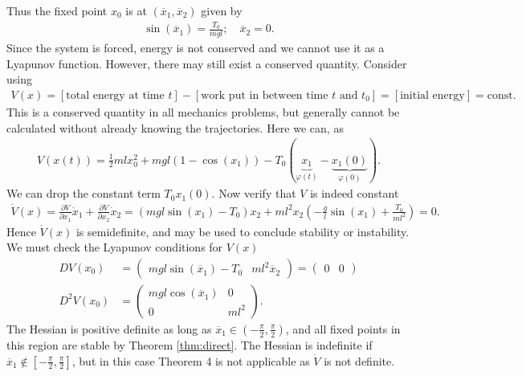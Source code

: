 \begin{ex}
Thus the fixed point $x_0$ is at $(\overline{x}_1, \overline{x}_2)$ given by 
\begin{align}
	\sin(\overline{x}_1) = \frac{T_0}{mgl};\quad \overline{x}_2=0.
\end{align}
Since the system is forced, energy is not conserved and we cannot use it as a Lyapunov function. However, there may still exist a conserved quantity. Consider using
\begin{align}
	V(x) = \left[  \textrm{total energy at time } t \right] - \left[  \textrm{work put in between time } t  \textrm{ and } t_0 \right] = \left[ \textrm{initial energy} \right] =  \textrm{const.}  
\end{align}
This is a conserved quantity in all mechanics problems, but generally cannot be calculated without already knowing the trajectories. Here we can, as
\begin{align}
	V(x(t)) = \frac{1}{2} ml x_0^2 + mgl(1- \cos(x_1)) - T_0(\underbrace{x_1}_{\varphi(t)} - \underbrace{x_1(0)}_{\varphi(0)}).
\end{align}
We can drop the constant term $T_0 x_1(0)$. Now verify that $V$ is indeed constant
\begin{align}
	\dot{V}(x) = \frac{\partial V}{\partial x_1} \dot{x}_1 + \frac{\partial V}{\partial x_2} \dot{x}_2 = \left( mgl \sin(x_1) - T_0\right) x_2 + ml^2x_2 \left( - \frac{g}{l}\sin(x_1) + \frac{T_0}{ml^2} \right) = 0.
\end{align}
Hence $\dot{V}(x)$ is semidefinite, and may be used to conclude stability or instability. We must check the Lyapunov conditions for $V(x)$ 
\begin{align}
	DV(x_0) &= 
\begin{pmatrix}
	mgl \sin(\overline{x}_1) - T_0 & ml^2 \overline{x}_2
\end{pmatrix}
=
\begin{pmatrix}
	0& 0
\end{pmatrix}
\\
D^2V(x_0) &= 
\begin{pmatrix}
	mgl \cos(\overline{x}_1) & 0 \\
	0 & ml^2
\end{pmatrix}.
\end{align}
The Hessian is positive definite as long as $\overline{x}_1 \in \left(-\frac{\pi }{2}, \frac{\pi }{2}\right)$, and all fixed points in this region are stable by Theorem \ref{thm:direct}. The Hessian is indefinite if $\overline{x}_1 \not \in \left[-\frac{\pi }{2}, \frac{\pi }{2}\right]$, but in this case Theorem 4 is not applicable as $\dot{V}$ is not definite.
 \end{ex}
 
